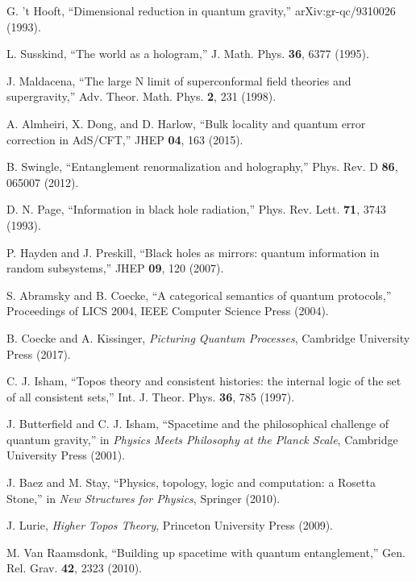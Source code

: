 \documentclass[11pt,a4paper]{article}
\theoremstyle{definition}
\begin{document}

\begin{thebibliography}{99}

G. 't Hooft, ``Dimensional reduction in quantum gravity,'' arXiv:gr-qc/9310026 (1993).

L. Susskind, ``The world as a hologram,'' J. Math. Phys. \textbf{36}, 6377 (1995).

J. Maldacena, ``The large N limit of superconformal field theories and supergravity,'' Adv. Theor. Math. Phys. \textbf{2}, 231 (1998).

A. Almheiri, X. Dong, and D. Harlow, ``Bulk locality and quantum error correction in AdS/CFT,'' JHEP \textbf{04}, 163 (2015).

B. Swingle, ``Entanglement renormalization and holography,'' Phys. Rev. D \textbf{86}, 065007 (2012).

D. N. Page, ``Information in black hole radiation,'' Phys. Rev. Lett. \textbf{71}, 3743 (1993).

P. Hayden and J. Preskill, ``Black holes as mirrors: quantum information in random subsystems,'' JHEP \textbf{09}, 120 (2007).

S. Abramsky and B. Coecke, ``A categorical semantics of quantum protocols,'' Proceedings of LICS 2004, IEEE Computer Science Press (2004).

B. Coecke and A. Kissinger, \textit{Picturing Quantum Processes}, Cambridge University Press (2017).

C. J. Isham, ``Topos theory and consistent histories: the internal logic of the set of all consistent sets,'' Int. J. Theor. Phys. \textbf{36}, 785 (1997).

J. Butterfield and C. J. Isham, ``Spacetime and the philosophical challenge of quantum gravity,'' in \textit{Physics Meets Philosophy at the Planck Scale}, Cambridge University Press (2001).

J. Baez and M. Stay, ``Physics, topology, logic and computation: a Rosetta Stone,'' in \textit{New Structures for Physics}, Springer (2010).

J. Lurie, \textit{Higher Topos Theory}, Princeton University Press (2009).

M. Van Raamsdonk, ``Building up spacetime with quantum entanglement,'' Gen. Rel. Grav. \textbf{42}, 2323 (2010).


\end{thebibliography}
\end{document}
